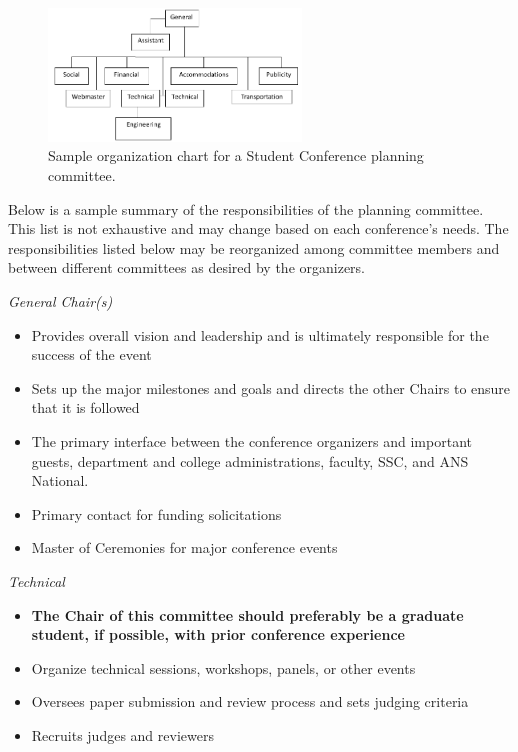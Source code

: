 \documentclass[12pt]{article}
\begin{document}
\begin{figure}[b]
    \centering
    \includegraphics[width=0.6\textwidth]{OrgChart.PNG}
    \caption{Sample organization chart for a Student Conference planning committee.}
    \label{fig:OrgChart}
\end{figure}

Below is a sample summary of the responsibilities of the planning committee.
This list is not exhaustive and may change based on each conference's needs.
The responsibilities listed below may be reorganized among committee members and between different committees as desired by the organizers.

\emph{General Chair(s)}
\begin{itemize}
    \item Provides overall vision and leadership and is ultimately responsible for the success of the event
    \item Sets up the major milestones and goals and directs the other Chairs to ensure that it is followed
    \item The primary interface between the conference organizers and important guests, department and college administrations, faculty, SSC, and ANS National.
    \item Primary contact for funding solicitations
    \item Master of Ceremonies for major conference events
\end{itemize}

\emph{Technical}
\begin{itemize}
    \item \textbf{The Chair of this committee should preferably be a graduate student, if possible, with prior conference experience}
    \item Organize technical sessions, workshops, panels, or other events
    \item Oversees paper submission and review process and sets judging criteria
    \item Recruits judges and reviewers
\end{itemize}
\end{document}
